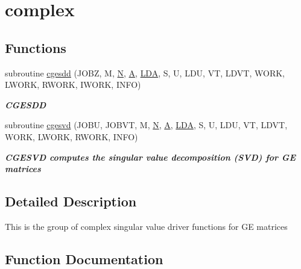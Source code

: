\hypertarget{group__complexGEsing}{}\section{complex}
\label{group__complexGEsing}
\subsection*{Functions}
\begin{DoxyCompactItemize}
\item 
subroutine \hyperlink{group__complexGEsing_ga609f3fc4da34716dd2bcd985924d20bd}{cgesdd} (J\+O\+B\+Z, M, \hyperlink{polmisc_8c_a0240ac851181b84ac374872dc5434ee4}{N}, \hyperlink{classA}{A}, \hyperlink{example__user_8c_ae946da542ce0db94dced19b2ecefd1aa}{L\+D\+A}, S, U, L\+D\+U, V\+T, L\+D\+V\+T, W\+O\+R\+K, L\+W\+O\+R\+K, R\+W\+O\+R\+K, I\+W\+O\+R\+K, I\+N\+F\+O)
\begin{DoxyCompactList}\small\item\em {\bfseries C\+G\+E\+S\+D\+D} \end{DoxyCompactList}\item 
subroutine \hyperlink{group__complexGEsing_ga0ed22d535ec7d84e8bf4f2f885df8c5c}{cgesvd} (J\+O\+B\+U, J\+O\+B\+V\+T, M, \hyperlink{polmisc_8c_a0240ac851181b84ac374872dc5434ee4}{N}, \hyperlink{classA}{A}, \hyperlink{example__user_8c_ae946da542ce0db94dced19b2ecefd1aa}{L\+D\+A}, S, U, L\+D\+U, V\+T, L\+D\+V\+T, W\+O\+R\+K, L\+W\+O\+R\+K, R\+W\+O\+R\+K, I\+N\+F\+O)
\begin{DoxyCompactList}\small\item\em {\bfseries  C\+G\+E\+S\+V\+D computes the singular value decomposition (S\+V\+D) for G\+E matrices} \end{DoxyCompactList}\end{DoxyCompactItemize}


\subsection{Detailed Description}
This is the group of complex singular value driver functions for G\+E matrices 

\subsection{Function Documentation}
\hypertarget{group__complexGEsing_ga609f3fc4da34716dd2bcd985924d20bd}{}
